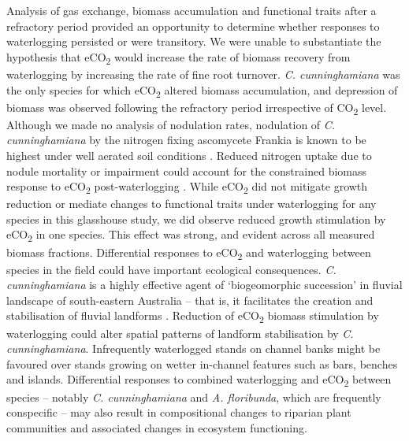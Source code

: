 \documentclass[openright,12pt,a4paper]{memoir}
\begin{document}
Analysis of gas exchange, biomass accumulation and functional traits after a refractory period provided an opportunity to determine whether responses to waterlogging persisted or were transitory. We were unable to substantiate the hypothesis that eCO\textsubscript{2} would increase the rate of biomass recovery from waterlogging by increasing the rate of fine root turnover. \textit{C. cunninghamiana} was the only species for which eCO\textsubscript{2} altered biomass accumulation, and depression of biomass was observed following the refractory period irrespective of CO\textsubscript{2} level. Although we made no analysis of nodulation rates, nodulation of \textit{C. cunninghamiana} by the nitrogen fixing ascomycete Frankia is known to be highest under well aerated soil conditions \citep{Dawson1989}. Reduced nitrogen uptake due to nodule mortality or impairment could account for the constrained biomass response to eCO\textsubscript{2} post-waterlogging \citep{Reich2006}. While eCO\textsubscript{2} did not mitigate growth reduction or mediate changes to functional traits under waterlogging for any species in this glasshouse study, we did observe reduced growth stimulation by eCO\textsubscript{2} in one species. This effect was strong, and evident across all measured biomass fractions. Differential responses to eCO\textsubscript{2} and waterlogging between species in the field could have important ecological consequences. \textit{C. cunninghamiana} is a highly effective agent of ‘biogeomorphic succession’ in fluvial landscape of south-eastern Australia – that is, it facilitates the creation and stabilisation of fluvial landforms \citep{Erskine2009}. Reduction of eCO\textsubscript{2} biomass stimulation by waterlogging could alter spatial patterns of landform stabilisation by \textit{C. cunninghamiana}. Infrequently waterlogged stands on channel banks might be favoured over stands growing on wetter in-channel features such as bars, benches and islands. Differential responses to combined waterlogging and eCO\textsubscript{2} between species – notably \textit{C. cunninghamiana} and \textit{A. floribunda}, which are frequently conspecific – may also result in compositional changes to riparian plant communities and associated changes in ecosystem functioning.
\end{document}
